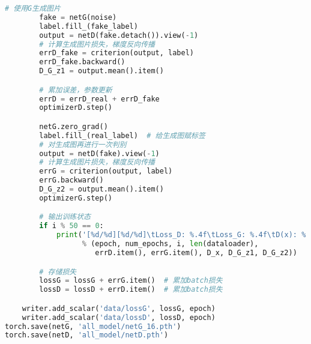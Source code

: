 \documentclass{report}
\begin{document}
\begin{lstlisting}[language=Python, caption=训练, label=code:discriminator]
        # 使用G生成图片
        fake = netG(noise)
        label.fill_(fake_label)
        output = netD(fake.detach()).view(-1)
        # 计算生成图片损失，梯度反向传播
        errD_fake = criterion(output, label)
        errD_fake.backward()
        D_G_z1 = output.mean().item()

        # 累加误差，参数更新
        errD = errD_real + errD_fake
        optimizerD.step()

        netG.zero_grad()
        label.fill_(real_label)  # 给生成图赋标签
        # 对生成图再进行一次判别
        output = netD(fake).view(-1)
        # 计算生成图片损失，梯度反向传播
        errG = criterion(output, label)
        errG.backward()
        D_G_z2 = output.mean().item()
        optimizerG.step()

        # 输出训练状态
        if i % 50 == 0:
            print('[%d/%d][%d/%d]\tLoss_D: %.4f\tLoss_G: %.4f\tD(x): %.4f\tD(G(z)): %.4f / %.4f'
                  % (epoch, num_epochs, i, len(dataloader),
                     errD.item(), errG.item(), D_x, D_G_z1, D_G_z2))

        # 存储损失
        lossG = lossG + errG.item()  # 累加batch损失
        lossD = lossD + errD.item()  # 累加batch损失

    writer.add_scalar('data/lossG', lossG, epoch)
    writer.add_scalar('data/lossD', lossD, epoch)
torch.save(netG, 'all_model/netG_16.pth')
torch.save(netD, 'all_model/netD.pth')
\end{lstlisting}
\end{document}
